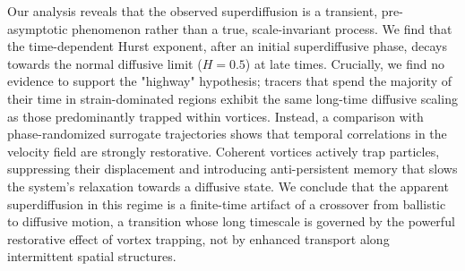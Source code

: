\documentclass[]{article}
\begin{document}
Our analysis reveals that the observed superdiffusion is a transient, pre-asymptotic phenomenon rather than a true, scale-invariant process. We find that the time-dependent Hurst exponent, after an initial superdiffusive phase, decays towards the normal diffusive limit ($H=0.5$) at late times. Crucially, we find no evidence to support the "highway" hypothesis; tracers that spend the majority of their time in strain-dominated regions exhibit the same long-time diffusive scaling as those predominantly trapped within vortices. Instead, a comparison with phase-randomized surrogate trajectories shows that temporal correlations in the velocity field are strongly restorative. Coherent vortices actively trap particles, suppressing their displacement and introducing anti-persistent memory that slows the system's relaxation towards a diffusive state. We conclude that the apparent superdiffusion in this regime is a finite-time artifact of a crossover from ballistic to diffusive motion, a transition whose long timescale is governed by the powerful restorative effect of vortex trapping, not by enhanced transport along intermittent spatial structures.
\end{document}
